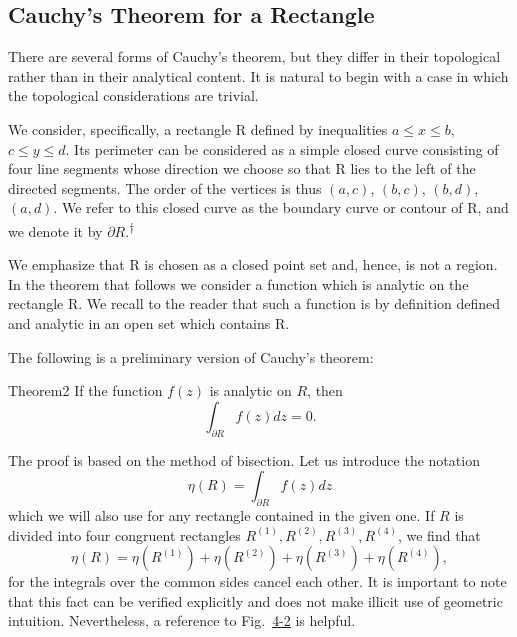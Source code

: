 \setcounter{section}{1}\setcounter{subsection}{3}\subsection{Cauchy's Theorem for a Rectangle}\label{sec:4.1.4}
There are several forms of Cauchy's theorem, but they differ in their topological rather than in their analytical content. It is natural to begin with a case in which the topological considerations are trivial.

We consider, specifically, a rectangle R defined by inequalities $a \leq x \leq b$, $c \leq y \leq d$. Its perimeter can be considered as a simple closed curve consisting of four line segments whose direction we choose so that R lies to the left of the directed segments. The order of the vertices is thus $(a,c)$, $(b,c)$, $(b,d)$, $(a,d)$. We refer to this closed curve as the boundary curve or contour of R, and we denote it by $\partial R.$\hyperlink{fn:125:dagger}{\textsuperscript{\ensuremath{\dagger}}}

We emphasize that R is chosen as a closed point set and, hence, is not a region. In the theorem that follows we consider a function which is analytic on the rectangle R. We recall to the reader that such a function is by definition defined and analytic in an open set which contains R.

The following is a preliminary version of Cauchy's theorem:

\begin{originalstatement}{Theorem}{2}\label{thm:4.2}
If the function $f(z)$ is analytic on $R$, then
\begin{equation*}
\int_ {\partial R} f (z) d z = 0.\tag{12}\label{eq:4.12}
\end{equation*}
\end{originalstatement}
The proof is based on the method of bisection. Let us introduce the notation
\begin{equation*}
\eta (R) = \int_ {\partial R} f (z) d z
\end{equation*}
which we will also use for any rectangle contained in the given one. If $R$ is divided into four congruent rectangles $R^{(1)}, R^{(2)}, R^{(3)}, R^{(4)}$, we find that
\begin{equation*}
\eta (R) = \eta (R ^ {(1)}) + \eta (R ^ {(2)}) + \eta (R ^ {(3)}) + \eta (R ^ {(4)}),\tag{13}\label{eq:4.13}
\end{equation*}
for the integrals over the common sides cancel each other. It is important to note that this fact can be verified explicitly and does not make illicit use of geometric intuition. Nevertheless, a reference to Fig.~\hyperref[fig:4-2]{4-2} is helpful.


